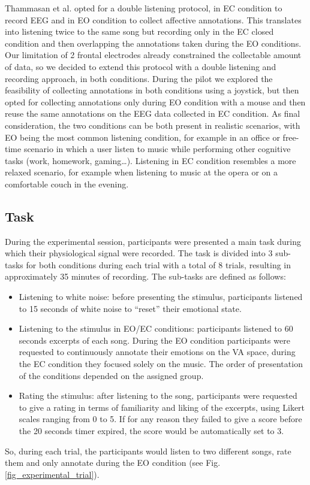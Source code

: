 Thammasan et al. \cite{thammasan_continuous_2016} opted for a double listening protocol, in \ac{EC} condition to record \ac{EEG} and in \ac{EO} condition to collect affective annotations. This translates into listening twice to the same song but recording only in the \ac{EC} closed condition and then overlapping the annotations taken during the \ac{EO} conditions. Our limitation of 2 frontal electrodes already constrained the collectable amount of data, so we decided to extend this protocol with a double listening and recording approach, in both conditions. During the pilot we explored the feasibility of collecting annotations in both conditions using a joystick, but then opted for collecting annotations only during \ac{EO} condition with a mouse and then reuse the same annotations on the \ac{EEG} data collected in \ac{EC} condition.  As final consideration, the two conditions can be both present in realistic scenarios, with \ac{EO} being the most common listening condition, for example in an office or free-time scenario in which a user listen to music while performing other cognitive tasks (work, homework, gaming…). Listening in \ac{EC} condition resembles a more relaxed scenario, for example when listening to music at the opera or on a comfortable couch in the evening.

\subsection{Task}
\label{sec:task}
During the experimental session, participants were presented a main task during which their physiological signal were recorded. The task is divided into 3 sub-tasks for both conditions during each trial with a total of 8 trials, resulting in approximately 35 minutes of recording. The sub-tasks are defined as follows:

\begin{itemize}
\item Listening to white noise: before presenting the stimulus, participants listened to 15 seconds of white noise to “reset” their emotional state.
\item Listening to the stimulus in EO/EC conditions: participants listened to 60 seconds excerpts of each song. During the \ac{EO} condition participants were requested to continuously annotate their emotions on the \ac{VA} space, during the \ac{EC} condition they focused solely on the music. The order of presentation of the conditions depended on the assigned group.
\item Rating the stimulus: after listening to the song, participants were requested to give a rating in terms of familiarity and liking of the excerpts, using Likert scales ranging from 0 to 5. If for any reason they failed to give a score before the 20 seconds timer expired, the score would be automatically set to 3.
\end{itemize}
So, during each trial, the participants would listen to two different songs, rate them and only annotate during the \ac{EO} condition (see Fig. \ref{fig_experimental_trial}). 

